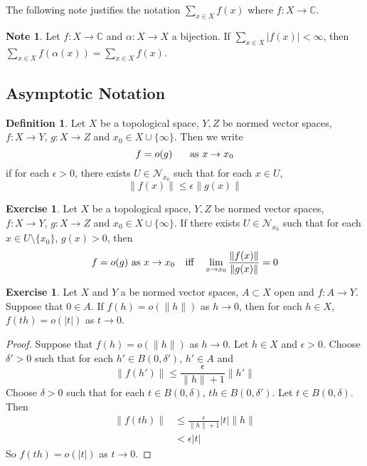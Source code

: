 \documentclass[12pt]{amsart}
\theoremstyle{definition}
\newtheorem{defn}[definition]{Definition}
\newtheorem{note}[definition]{Note}
\newtheorem{ex}[definition]{Exercise}
\newcommand{\al}{\alpha}
\newcommand{\del}{\delta}
\newcommand{\ep}{\epsilon}
\newcommand{\C}{\mathbb{C}}
\newcommand{\MN}{\mathcal{N}}
\DeclareMathOperator*{\0}{\mbf{0}}
\DeclareMathOperator*{\1}{\mbf{1}}
\newcommand{\lex}[1]{\label{ex:#1}}
\newcommand{\ld}[1]{\label{defn:#1}}
\begin{document}
	The following note justifies the notation $\sum_{x \in X}f(x)$ where $f:X \rightarrow \C$.
	
	\begin{note}
		Let $f:X \rightarrow \C$ and $\al:X \rightarrow X$ a bijection. If $\sum_{x \in X}|f(x)|< \infty$, then $\sum_{x \in X}f( \al (x)) = \sum_{x \in X}f(x) $.
	\end{note}
	
	\newpage	
	
	\subsection{Asymptotic Notation}
	
	\begin{defn} \ld{}
	Let $X$ be a topological space, $Y, Z$ be normed vector spaces, $f:X \rightarrow Y$, $g: X \rightarrow Z$ and $x_0 \in X \cup \{\infty\}$. Then we write $$f = o(g) \hspace{.5cm} \text{ as } x \rightarrow x_0$$ if for each $\ep >0$, there exists $U \in \MN_{x_0}$ such that for each $x \in U$, $$\|f(x)\| \leq \ep\|g(x)\|$$
	\end{defn}
	
	\begin{ex} \lex{}
	Let $X$ be a topological space, $Y, Z$ be normed vector spaces, $f:X \rightarrow Y$, $g: X \rightarrow Z$ and $x_0 \in X \cup \{\infty\}$. If there exists $U \in \MN_{x_0}$ such that for each $x \in U \setminus \{x_0\}$, $g(x) > 0$, then $$f = o(g) \text{ as } x \rightarrow x_0 \hspace{.25cm} \text{ iff } \hspace{.25cm}  \lim_{x \rightarrow x_0} \frac{\| f(x) \|}{\| g(x) \|} = 0$$
	\end{ex}	
	
	\begin{ex} \lex{}
	Let $X$ and $Y$ a be normed vector spaces, $A \subset X$ open and $f:A \rightarrow Y$. Suppose that $0 \in A$. If $f(h) = o(\|h\|)$ as $h \rightarrow 0$, then for each $h \in X$,  $f(th) = o(|t|)$ as $t \rightarrow 0$.
	\end{ex}	
	
	\begin{proof}
	Suppose that $f(h) = o(\|h\|)$ as $h \rightarrow 0$.  Let $h \in X$ and $\ep >0$. Choose $\del' >0 $ such that for each $h' \in B(0, \del')$, $h' \in A$ and 
	$$\|f(h')\| \leq \frac{\ep}{\|h\|+1} \|h'\|$$ 
	Choose $\del >0$ such that for each $t \in B(0,\del)$, $th \in B(0,\del')$. Let $t \in B(0,\del)$. Then 
	\begin{align*}
	\|f(th)\| 
	&\leq \frac{\ep}{\|h\|+1} |t|\|h\| \\
	&< \ep |t|
	\end{align*}
	So $f(th) = o(|t|)$ as $t \rightarrow 0$.
	\end{proof}		
	
\end{document}
